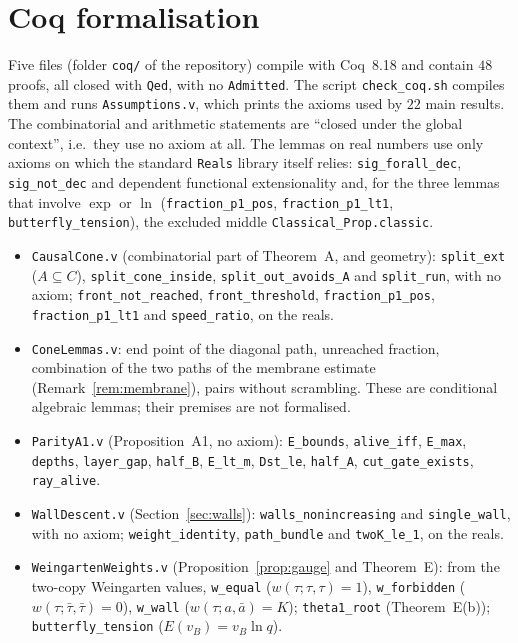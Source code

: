 \section{Coq formalisation}\label{app:coq}

Five files (folder \texttt{coq/} of the repository) compile with Coq~8.18 and contain $48$ proofs, all closed with \texttt{Qed}, with no \texttt{Admitted}. The script \texttt{check\_coq.sh} compiles them and runs \texttt{Assumptions.v}, which prints the axioms used by $22$ main results. The combinatorial and arithmetic statements are ``closed under the global context'', i.e.\ they use no axiom at all. The lemmas on real numbers use only axioms on which the standard \texttt{Reals} library itself relies: \texttt{sig\_forall\_dec}, \texttt{sig\_not\_dec} and dependent functional extensionality and, for the three lemmas that involve $\exp$ or $\ln$ (\texttt{fraction\_p1\_pos}, \texttt{fraction\_p1\_lt1}, \texttt{butterfly\_tension}), the excluded middle \texttt{Classical\_Prop.classic}.
\begin{itemize}[leftmargin=*,itemsep=1pt]
\item \texttt{CausalCone.v} (combinatorial part of Theorem~A, and geometry): \texttt{split\_ext} ($A\subseteq C$), \texttt{split\_cone\_inside}, \texttt{split\_out\_avoids\_A} and \texttt{split\_run}, with no axiom; \texttt{front\_not\_reached}, \texttt{front\_threshold}, \texttt{fraction\_p1\_pos}, \texttt{fraction\_p1\_lt1} and \texttt{speed\_ratio}, on the reals.
\item \texttt{ConeLemmas.v}: end point of the diagonal path, unreached fraction, combination of the two paths of the membrane estimate (Remark~\ref{rem:membrane}), pairs without scrambling. These are conditional algebraic lemmas; their premises are not formalised.
\item \texttt{ParityA1.v} (Proposition~A1, no axiom): \texttt{E\_bounds}, \texttt{alive\_iff}, \texttt{E\_max}, \texttt{depths}, \texttt{layer\_gap}, \texttt{half\_B}, \texttt{E\_lt\_m}, \texttt{Dst\_le}, \texttt{half\_A}, \texttt{cut\_gate\_exists}, \texttt{ray\_alive}.
\item \texttt{WallDescent.v} (Section~\ref{sec:walls}): \texttt{walls\_nonincreasing} and \texttt{single\_wall}, with no axiom; \texttt{weight\_identity}, \texttt{path\_bundle} and \texttt{twoK\_le\_1}, on the reals.
\item \texttt{WeingartenWeights.v} (Proposition~\ref{prop:gauge} and Theorem~E): from the two-copy Weingarten values, \texttt{w\_equal} ($w(\tau;\tau,\tau)=1$), \texttt{w\_forbidden} ($w(\tau;\bar\tau,\bar\tau)=0$), \texttt{w\_wall} ($w(\tau;a,\bar a)=K$); \texttt{theta1\_root} (Theorem~E(b)); \texttt{butterfly\_tension} ($E(v_B)=v_B\ln q$).
\end{itemize}


